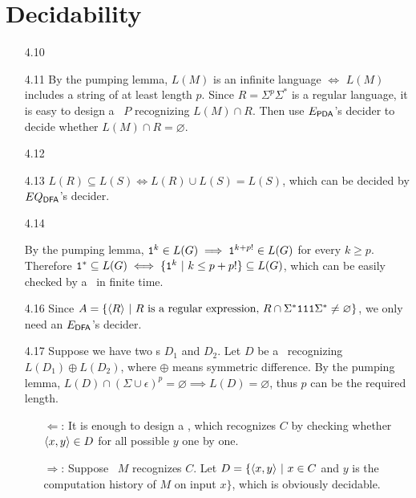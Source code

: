\section{Decidability}

\begin{itemize}
	
	\item[4.10]
	\Omit
	
	\item[4.11]
	By the pumping lemma, $L(M)$ is an infinite language $\iff$ $L(M)$ includes a string of at least length $p$. Since $R = \Sigma^p \Sigma^*$ is a regular language, it is easy to design a \PDA \ $P$ recognizing $L(M) \cap R$. Then use $E_{\PDA}$'s decider to decide whether $L(M) \cap R = \varnothing$.
	
	\item[4.12]
	\Omit
	
	\item[4.13]
	$L(R) \subseteq L(S) \iff L(R) \cup L(S) = L(S)$, which can be decided by $EQ_{\DFA}$'s decider.
	
	\item[4.14]
	\Omit
	
	\item[\Star 4.15]
	By the pumping lemma, $\TT{1}^k \in L(G) \implies \TT{1}^{k+p!} \in L(G)$ for every $k \geq p$. Therefore $\TT{1}^* \subseteq L(G) \iff \{ \TT{1}^k \ | \ k \leq p+p! \} \subseteq L(G)$, which can be easily checked by a \TM \ in finite time.
	
	\item[4.16]
	Since $A = \{ \Bra{R} \ | \ \text{$R$ is a regular expression, } R \cap \Sigma^* \TT{111} \Sigma^* \neq \varnothing \}$, we only need an $E_{\DFA}$'s decider.
	
	\item[4.17]
	Suppose we have two \DFA s $D_1$ and $D_2$. Let $D$ be a \DFA \ recognizing $L(D_1) \oplus L(D_2)$, where $\oplus$ means symmetric difference. By the pumping lemma, $L(D) \cap (\Sigma \cup \epsilon)^p = \varnothing \implies L(D) = \varnothing$, thus $p$ can be the required length.
	
	\item[\Star 4.18] 
	\begin{itemize}
		\item[$\Leftarrow$:] It is enough to design a \TM , which recognizes $C$ by checking whether $\Bra{x,y} \in D$ for all possible $y$ one by one.
		\item[$\Rightarrow$:] Suppose \TM \ $M$ recognizes $C$. Let $D = \{ \Bra{x,y} \ | \ x \in C$  and $y$ is the computation history of $M$ on input $x \}$, which is obviously decidable.
	\end{itemize}


\end{itemize}
